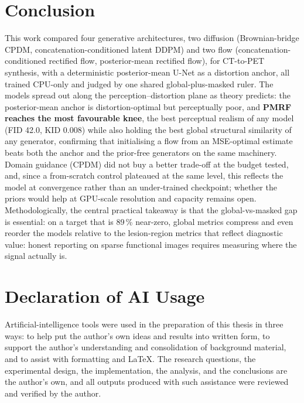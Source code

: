 \documentclass[11pt,a4paper]{article}
\newcommand{\num}[1]{#1}
\begin{document}
\section{Conclusion}
\label{sec:conclusion}
This work compared four generative architectures, two diffusion (Brownian-bridge CPDM,
concatenation-conditioned latent DDPM) and two flow (concatenation-conditioned rectified flow,
posterior-mean rectified flow), for CT-to-PET synthesis, with a deterministic posterior-mean
U-Net as a distortion anchor, all trained CPU-only and judged by one shared global-plus-masked
ruler. The models spread out along the perception--distortion plane as theory predicts: the
posterior-mean anchor is distortion-optimal but perceptually poor, and \textbf{PMRF reaches the
most favourable knee}, the best perceptual realism of any model (FID \num{42.0}, KID
\num{0.008}) while also holding the best global structural similarity of any generator,
confirming that initialising a flow from an MSE-optimal estimate beats both the anchor and the
prior-free generators on the same machinery. Domain guidance (CPDM) did not buy a better
trade-off at the budget tested, and, since a from-scratch control plateaued at the same level,
this reflects the model at convergence rather than an under-trained checkpoint; whether the
priors would help at GPU-scale resolution and capacity remains open.
Methodologically, the central practical takeaway is that the global-vs-masked gap is
essential: on a target that is \num{89}\,\% near-zero, global metrics compress and even
reorder the models relative to the lesion-region metrics that reflect diagnostic value: honest reporting on sparse functional images requires measuring where the signal actually is.

\clearpage
\printbibliography

\clearpage
\section*{Declaration of AI Usage}
Artificial-intelligence tools were used in the preparation of this thesis in three ways: to help
put the author's own ideas and results into written form, to support the author's understanding
and consolidation of background material, and to assist with formatting and \LaTeX{}. The research
questions, the experimental design, the implementation, the analysis, and the conclusions are the
author's own, and all outputs produced with such assistance were reviewed and verified by the
author.
\end{document}
